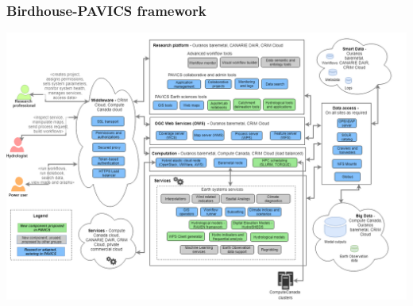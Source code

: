 \begin{frame}

\frametitle{Birdhouse-PAVICS framework}

\begin{center}
 \vspace{-0.5cm}
 \includegraphics[width=1.1\textwidth]{./images/PAVICS_architecture.png}
\end{center}

\end{frame}


